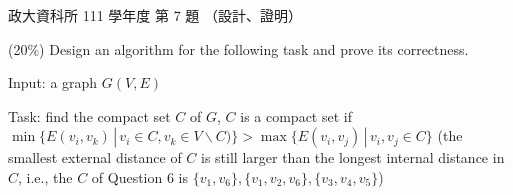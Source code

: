 \begin{pastexam}[label={px:nccu-111-dsa-07}]{政大資科所 111 學年度 第 7 題}
（設計、證明）

(20\%) Design an algorithm for the following task and prove its correctness.

\hspace*{2em}Input: a graph $G(V,E)$

\hspace*{2em}\parbox[t]{0.9\textwidth}{Task: find the compact set $C$ of $G$, $C$ is a compact set if $\min\{E(v_i,v_k)\,|\,v_i\in C, v_k\in V\backslash C)\} > \max\{E(v_i,v_j)\,|\,v_i,v_j\in C\}$ (the smallest external distance of $C$ is still larger than the longest internal distance in $C$, i.e., the $C$ of Question 6 is $\{v_1, v_6\}, \{v_1, v_2, v_6\}, \{v_3, v_4, v_5\}$)}
\end{pastexam}

